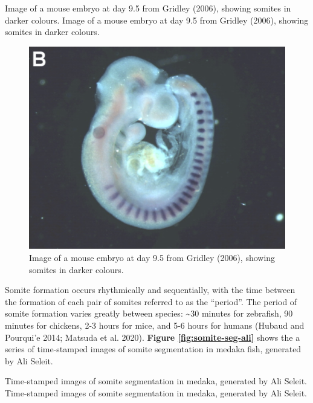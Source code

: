 \documentclass[
]{book}
\begin{document}
Image of a mouse embryo at day 9.5 from Gridley (2006), showing somites in darker colours. Image of a mouse embryo at day 9.5 from Gridley (2006), showing somites in darker colours.

\begin{figure}
\includegraphics[width=1\linewidth]{figs/somites/mouse_embryo_gridley} \caption{Image of a mouse embryo at day 9.5 from Gridley (2006), showing somites in darker colours.}\label{fig:mouse-embryo}
\end{figure}

Somite formation occurs rhythmically and sequentially, with the time between the formation of each pair of somites referred to as the ``period''. The period of somite formation varies greatly between species: \textasciitilde30 minutes for zebrafish, 90 minutes for chickens, 2-3 hours for mice, and 5-6 hours for humans (Hubaud and Pourqui'e 2014; Matsuda et al. 2020). \textbf{Figure \ref{fig:somite-seg-ali}} shows the a series of time-stamped images of somite segmentation in medaka fish, generated by Ali Seleit.

Time-stamped images of somite segmentation in medaka, generated by Ali Seleit. Time-stamped images of somite segmentation in medaka, generated by Ali Seleit.
\end{document}

